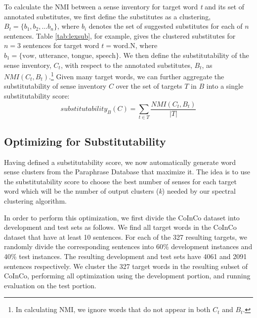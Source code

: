 \documentclass[11pt]{article}
\begin{document}
\noindent To calculate the NMI between a sense inventory for target word \textit{t} and its set of annotated substitutes, we first define the substitutes as a clustering, $B_t = \{b_1, b_2, \dots b_n\}$, where $b_i$ denotes the set of suggested substitutes for each of $n$ sentences. Table \ref{tab:lexsub}, for example, gives the clustered substitutes for $n=3$ sentences for target word $t=\text{word.N}$, where $b_1 = \{\text{vow, utterance, tongue, speech}\}$. We then define the substitutability of the sense inventory, $C_t$, with respect to the annotated substitutes, $B_t$, as $NMI(C_t, B_t)$.\footnote{In calculating NMI, we ignore words that do not appear in both $C_t$ and $B_t$.} Given many target words, we can further aggregate the substitutability of sense inventory $C$ over the set of targets $T$ in $B$ into a single substitutability score:
\[substitutability_B(C) = \sum_{t \in T} \frac{NMI(C_t, B_t)}{|T|}\]

\subsection{Optimizing for Substitutability}
\label{optim}

Having defined a substitutability score, we now automatically generate word sense clusters from the Paraphrase Database that maximize it. The idea is to use the substitutability score to choose the best number of senses for each target word which will be the number of output clusters (\textit{k}) needed by our spectral clustering algorithm. 

In order to perform this optimization, we first divide the CoInCo dataset into development and test sets as follows. We find all target words in the CoInCo dataset that have at least 10 sentences. For each of the 327 resulting targets, we randomly divide the corresponding sentences into 60\% development instances and 40\% test instances. The resulting development and test sets have 4061 and 2091 sentences respectively. We cluster the 327 target words in the resulting subset of CoInCo, performing all optimization using the development portion, and running evaluation on the test portion.
\end{document}
